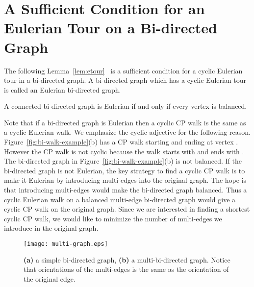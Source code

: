 \documentclass[runningheads]{llncs}
\begin{document}
\section{A Sufficient Condition for an Eulerian Tour on a Bi-directed Graph} 
The following Lemma~\ref{lem:etour}~\cite{bidirected_graph} is a sufficient condition for a cyclic 
Eulerian tour in a bi-directed graph. A bi-directed graph which has a cyclic Eulerian tour is called
an Eulerian bi-directed graph.
\begin{lemma}
\label{lem:etour}
A connected bi-directed graph is Eulerian if and only if every vertex is balanced.
\end{lemma}
Note that if a bi-directed graph is Eulerian then a cyclic CP walk is the same as a cyclic Eulerian
walk. We emphasize the cyclic adjective for the following reason. Figure~\ref{fig:bi-walk-example}(b) has a 
CP walk starting and ending at vertex . However the CP walk is not cyclic because the walk starts
with  and ends with . The bi-directed graph in Figure~\ref{fig:bi-walk-example}(b)
is not balanced. If the bi-directed graph is not Eulerian, the key strategy to find
a cyclic CP walk is to make it Eulerian by introducing multi-edges into the original graph. The hope is that 
introducing multi-edges would make the bi-directed graph balanced. Thus a cyclic Eulerian walk on a balanced 
multi-edge bi-directed graph would give a cyclic CP walk on the original graph. Since we are interested
in finding a shortest cyclic CP walk, we would like to minimize the number of multi-edges we introduce
in the original graph.

\begin{figure*}
\label{fig:multi-example}
\begin{center}
\texttt{[image: multi-graph.eps]}
\end{center}
\caption{{\bf (a)} a simple bi-directed graph, {\bf (b)} a multi-bi-directed graph. Notice that orientations
of the multi-edges is the same as the orientation of the original edge.}
\end{figure*}
\end{document}
